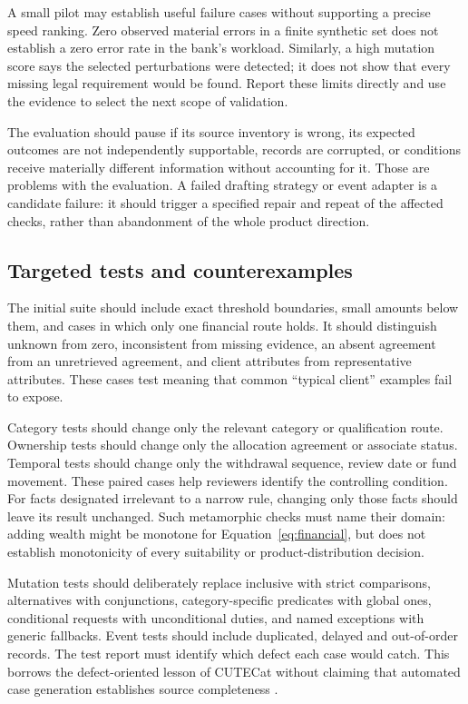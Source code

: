 A small pilot may establish useful failure cases without supporting a precise
speed ranking. Zero observed material errors in a finite synthetic set does not
establish a zero error rate in the bank's workload. Similarly, a high mutation
score says the selected perturbations were detected; it does not show that every
missing legal requirement would be found. Report these limits directly and use
the evidence to select the next scope of validation.

The evaluation should pause if its source inventory is wrong, its expected
outcomes are not independently supportable, records are corrupted, or conditions
receive materially different information without accounting for it. Those are
problems with the evaluation. A failed drafting strategy or event adapter is a
candidate failure: it should trigger a specified repair and repeat of the affected
checks, rather than abandonment of the whole product direction.

\subsection{Targeted tests and counterexamples}

The initial suite should include exact threshold boundaries, small amounts below
them, and cases in which only one financial route holds. It should distinguish
unknown from zero, inconsistent from missing evidence, an absent agreement from
an unretrieved agreement, and client attributes from representative attributes.
These cases test meaning that common ``typical client'' examples fail to expose.

Category tests should change only the relevant category or qualification route.
Ownership tests should change only the allocation agreement or associate status.
Temporal tests should change only the withdrawal sequence, review date or fund
movement. These paired cases help reviewers identify the controlling condition.
For facts designated irrelevant to a narrow rule, changing only those facts should
leave its result unchanged. Such metamorphic checks must name their domain:
adding wealth might be monotone for Equation~\eqref{eq:financial}, but does not
establish monotonicity of every suitability or product-distribution decision.

Mutation tests should deliberately replace inclusive with strict comparisons,
alternatives with conjunctions, category-specific predicates with global ones,
conditional requests with unconditional duties, and named exceptions with generic
fallbacks. Event tests should include duplicated, delayed and out-of-order records.
The test report must identify which defect each case would catch. This borrows
the defect-oriented lesson of CUTECat without claiming that automated case
generation establishes source completeness \citep{cutecat2025}.


